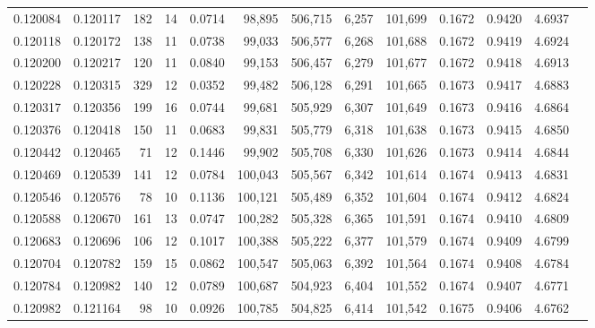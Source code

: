 \begin{tabular}{rrrrrrrrrrrrr}
0.120084 & 0.120117 &   182 &  14 &                                     0.0714 &  98,895 & 506,715 &   6,257 & 101,699 & 0.1672 & 0.9420 & 4.6937 \\
0.120118 & 0.120172 &   138 &  11 &                                     0.0738 &  99,033 & 506,577 &   6,268 & 101,688 & 0.1672 & 0.9419 & 4.6924 \\
0.120200 & 0.120217 &   120 &  11 &                                     0.0840 &  99,153 & 506,457 &   6,279 & 101,677 & 0.1672 & 0.9418 & 4.6913 \\
0.120228 & 0.120315 &   329 &  12 &                                     0.0352 &  99,482 & 506,128 &   6,291 & 101,665 & 0.1673 & 0.9417 & 4.6883 \\
0.120317 & 0.120356 &   199 &  16 &                                     0.0744 &  99,681 & 505,929 &   6,307 & 101,649 & 0.1673 & 0.9416 & 4.6864 \\
0.120376 & 0.120418 &   150 &  11 &                                     0.0683 &  99,831 & 505,779 &   6,318 & 101,638 & 0.1673 & 0.9415 & 4.6850 \\
0.120442 & 0.120465 &    71 &  12 &                                     0.1446 &  99,902 & 505,708 &   6,330 & 101,626 & 0.1673 & 0.9414 & 4.6844 \\
0.120469 & 0.120539 &   141 &  12 &                                     0.0784 & 100,043 & 505,567 &   6,342 & 101,614 & 0.1674 & 0.9413 & 4.6831 \\
0.120546 & 0.120576 &    78 &  10 &                                     0.1136 & 100,121 & 505,489 &   6,352 & 101,604 & 0.1674 & 0.9412 & 4.6824 \\
0.120588 & 0.120670 &   161 &  13 &                                     0.0747 & 100,282 & 505,328 &   6,365 & 101,591 & 0.1674 & 0.9410 & 4.6809 \\
0.120683 & 0.120696 &   106 &  12 &                                     0.1017 & 100,388 & 505,222 &   6,377 & 101,579 & 0.1674 & 0.9409 & 4.6799 \\
0.120704 & 0.120782 &   159 &  15 &                                     0.0862 & 100,547 & 505,063 &   6,392 & 101,564 & 0.1674 & 0.9408 & 4.6784 \\
0.120784 & 0.120982 &   140 &  12 &                                     0.0789 & 100,687 & 504,923 &   6,404 & 101,552 & 0.1674 & 0.9407 & 4.6771 \\
0.120982 & 0.121164 &    98 &  10 &                                     0.0926 & 100,785 & 504,825 &   6,414 & 101,542 & 0.1675 & 0.9406 & 4.6762 \\

\end{tabular}
